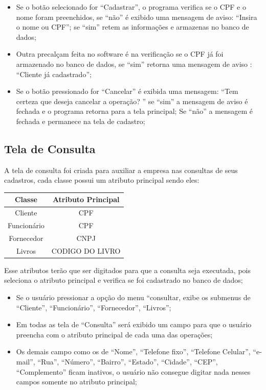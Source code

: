 \begin{itemize}
 \item Se o botão selecionado for “Cadastrar”, o programa verifica se o  CPF e o nome foram preenchidos, se “não” é exibido uma mensagem de aviso: “Insira o nome ou CPF”; se “sim” retem as informações e armazenas no banco de dados;

 \item Outra precalçam feita no software é na verificação se o CPF já foi armazenado no banco de dados, se “sim” retorna uma mensagem de aviso : “Cliente já cadastrado”;

  \item Se o botão pressionado for “Cancelar”  é exibida uma mensagem: “Tem certeza que deseja cancelar a operação? ” se “sim” a mensagem de aviso é fechada e o programa retorna para a tela principal; Se “não” a mensagem é fechada e permanece na tela de cadastro;

\end{itemize}




\subsection{Tela de Consulta}

A  tela de consulta foi criada para auxiliar a empresa nas consultas de seus cadastros, cada classe possui
um atributo principal sendo eles: 


\begin{table}[H]
\centering
\begin{tabular}{|c|c|}\hline
\textbf{Classe} & \textbf{Atributo Principal}\\\hline
Cliente & CPF\\\hline
Funcionário & CPF\\\hline
Fornecedor & CNPJ\\\hline
Livros & CODIGO DO LIVRO\\\hline
\end{tabular}
\end{table}

Esse atributos terão que ser digitados para que a consulta seja executada, pois seleciona o atributo principal
e verifica se foi cadastrado no banco de dados;

\begin{itemize}
 \item Se o usuário pressionar a opção do menu “consultar, exibe os submenus de “Cliente”, “Funcionário”, “Fornecedor”, “Livros”;


 \item Em todas as tela de “Consulta” será exibido um campo para que o usuário preencha com o atributo principal de cada uma das operações;

 \item Os demais campo como os de “Nome”,  “Telefone fixo”, “Telefone Celular”, “e-mail”, “Rua”, “Número”, “Bairro”, “Estado”, “Cidade”, “CEP”, “Complemento” ficam inativos, o usuário não consegue digitar nada nesses campos somente no atributo principal;
\end{itemize}

